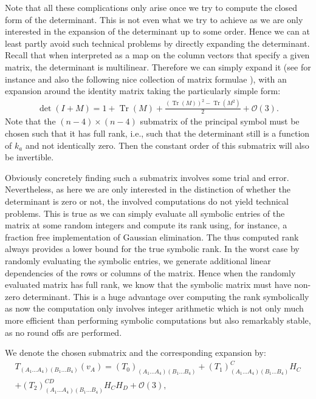 Note that all these complications only arise once we try to compute the closed form of the determinant. This is not even what we try to achieve as we are only interested in the expansion of the determinant up to some order. Hence we can at least partly avoid such technical problems by directly expanding the determinant. Recall that when interpreted as a map on the column vectors that specify a given matrix, the determinant is multilinear. Therefore we can simply expand it (see for instance \cite{2008CoTPh..49..801Z} and also the following nice collection of matrix formulae \cite{IMM2012-03274}), with an expansion around the identity matrix taking the particularly simple form:
\begin{align}\label{detExp}
    \operatorname{det}(I+M) = 1 + \operatorname{Tr}(M) + \frac{(\operatorname{Tr}(M))^2- \operatorname{Tr}(M^2)}{2} + \mathcal{O}(3). 
\end{align}
Note that the $(n-4)\times (n-4)$ submatrix of the principal symbol must be chosen such that it has full rank, i.e., such that the determinant still is a function of $k_a$ and not identically zero. 
Then
the constant order of this submatrix will also be invertible.
\begin{remark}
Obviously concretely finding such a submatrix involves some trial and error. Nevertheless, as here we are only interested in the distinction of whether the determinant is zero or not, the involved computations do not yield technical problems. This is true as we can simply evaluate all symbolic entries of the matrix at some random integers and compute its rank using, for instance, a fraction free implementation of Gaussian elimination. The thus computed rank always provides a lower bound for the true symbolic rank. In the worst case by randomly evaluating the symbolic entries, we generate additional linear dependencies of the rows or columns of the matrix. Hence when the randomly evaluated matrix has full rank, we know that the symbolic matrix must have non-zero determinant. This is a huge advantage over computing the rank symbolically as now the computation only involves integer arithmetic which is not only much more efficient than performing symbolic computations but also remarkably stable, as no round offs are performed.
\end{remark}
We denote the chosen submatrix and the corresponding expansion by:
\begin{multline}
    T_{(A_1...A_4)(B_1...B_4)}(v_A) = (T_0)_{(A_1...A_4)(B_1...B_4)} + (T_1)_{(A_1...A_4)(B_1...B_4)}^{C} H_C \\
    +(T_2)_{(A_1...A_4)(B_1...B_4)}^{CD} H_C H_D + \mathcal{O}(3),
\end{multline}
